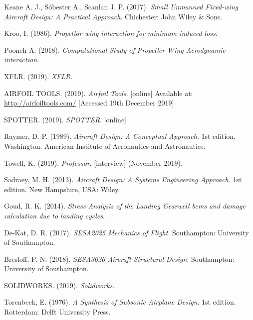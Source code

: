 \documentclass[../main.tex]{subfiles}
\begin{document}
\begin{thebibliography}{999}


  Keane A. J., S\'obester A., Scanlan J. P.
  (2017).
  \emph{Small Unmanned Fixed-wing Aircraft Design: A Practical Approach}.
  Chichester: John Wiley \& Sons.

Kroo, I.
(1986).
\emph{Propellor-wing interaction for minimum induced loss}.

  Pooneh A.
  (2018).
  \emph{Computational Study of Propeller-Wing Aerodynamic interaction}.

  XFLR.
  (2019).
  \emph{XFLR}.

  AIRFOIL TOOLS.
  (2019).
  \emph{Airfoil Tools}.
  [online]
  Available at:
  \url{http://airfoiltools.com/}
  [Accessed 19th December 2019]

  SPOTTER.
  (2019).
  \emph{SPOTTER}.
  [online]

  Raymer, D. P.
  (1989).
  \emph{Aircraft Design: A Conceptual Approach}.
  1st edition.
  Washington: American Institute of Aeronautics and Astronautics.

  Towell, K.
  (2019).
  \emph{Professor}.
  [interview]
  (November 2019).

  Sadraey, M. H.
  (2013).
  \emph{Aircraft Design: A Systems Engineering Approach}.
  1st edition.
  New Hampshire, USA: Wiley.

  Goud, R. K.
  (2014).
  \emph{Stress Analysis of the Landing Gearwell bems and damage calculation due to landing cycles}.

  De-Kat, D. R.
  (2017).
  \emph{SESA2025 Mechanics of Flight}.
  Southampton: University of Southampton.

  Bresloff, P. N.
  (2018).
  \emph{SESA3026 Aircraft Structural Design}.
  Southampton: University of Southampton.


  SOLIDWORKS.
  (2019).
  \emph{Solidworks}.

  Torenbeek, E.
  (1976).
  \emph{A Synthesis of Subsonic Airplane Design}.
  1st edition.
  Rotterdam: Delft University Press.

\end{thebibliography}
\end{document}
